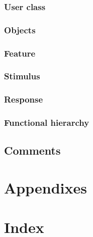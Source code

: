 \documentclass[draftclsnofoot,onecolumn,letterpaper,10pt,compsoc]{IEEEtran}
\begin{document}
		\subsubsection{User class}
		\subsubsection{Objects}
		\subsubsection{Feature}
		\subsubsection{Stimulus}
		\subsubsection{Response}
		\subsubsection{Functional hierarchy}
	\subsection{Comments}
\section{Appendixes}
\section{Index}

\pagebreak

\end{document}

